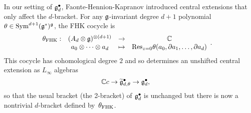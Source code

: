 \documentclass[11pt]{amsart}
\begin{document}
In our setting of $\mathfrak g^\bullet_d$, Faonte-Hennion-Kapranov introduced central extensions that only affect the $d$-bracket.
For any $\mathfrak g$-invariant degree $d+1$ polynomial  $\theta \in \operatorname{Sym}^{d+1}(\mathfrak g^*)^\mathfrak g$,  the FHK  cocycle is
\[
\label{fhk cocycle}
\begin{array}{cccc}
\theta_{\rm FHK} : & (A_d \otimes \mathfrak g)^{\otimes (d+1)} & \to & \mathbb C\\ 
& a_0 \otimes \cdots \otimes a_d & \mapsto & {\rm Res}_{z=0} \theta(a_0,\partial a_1,\ldots,\partial a_d)
\end{array}.
\]
This cocycle has cohomological degree $2$ and so determines an unshifted central extension as $L_\infty$ algebras
\[
\mathbb C c \to \widetilde{\mathfrak g}^\bullet_{d, \theta} \to \mathfrak g^\bullet_d ,
\]
so that the usual bracket (the 2-bracket) of $\mathfrak g^\bullet_d$ is unchanged but there is now a nontrivial $d$-bracket defined by~$\theta_{\rm FHK}$.
\end{document}
